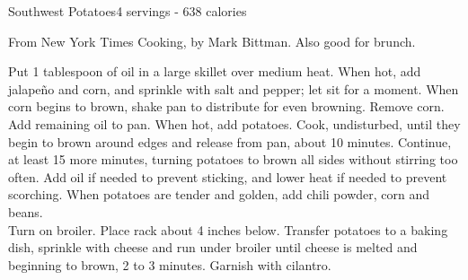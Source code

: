 \begin{recipe}{Southwest Potatoes}{4 servings - 638 calories}{}

\freeform From New York Times Cooking, by Mark Bittman. Also good for brunch.


Put 1 tablespoon of oil in a large skillet over medium heat. When hot, add jalapeño and corn, and sprinkle with salt and pepper; let sit for a moment. When corn begins to brown, shake pan to distribute for even browning. Remove corn.\\

Add remaining oil to pan. When hot, add potatoes. Cook, undisturbed, until they begin to brown around edges and release from pan, about 10 minutes. Continue, at least 15 more minutes, turning potatoes to brown all sides without stirring too often. Add oil if needed to prevent sticking, and lower heat if needed to prevent scorching. When potatoes are tender and golden, add chili powder, corn and beans.\\

Turn on broiler. Place rack about 4 inches below. Transfer potatoes to a baking dish, sprinkle with cheese and run under broiler until cheese is melted and beginning to brown, 2 to 3 minutes. Garnish with cilantro.

\end{recipe}